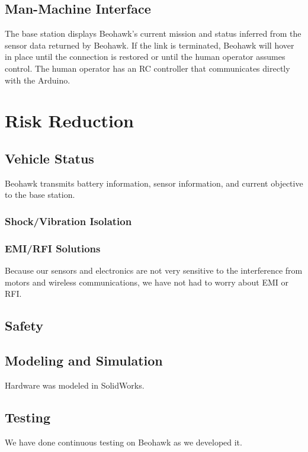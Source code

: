 \documentclass[12pt, letterpaper]{article}
\begin{document}
\subsection{Man-Machine Interface}
The base station displays Beohawk's current mission and status inferred from the sensor data returned by Beohawk.  If the link is terminated, Beohawk will  hover in place until the connection is restored or until the human operator assumes control. The human operator has an RC controller that communicates directly with the Arduino.


\section{Risk Reduction}
\subsection{Vehicle Status}
Beohawk transmits battery information, sensor information, and current objective to the base station. 

\subsubsection{Shock/Vibration Isolation}

\subsubsection{EMI/RFI Solutions}
Because our sensors and electronics are not very sensitive to the interference from motors and wireless communications, we have not had to worry about EMI or RFI.

\subsection{Safety}

\subsection{Modeling and Simulation}
Hardware was modeled in SolidWorks.

\subsection{Testing}
We have done continuous testing on Beohawk as we developed it. 
\end{document}
